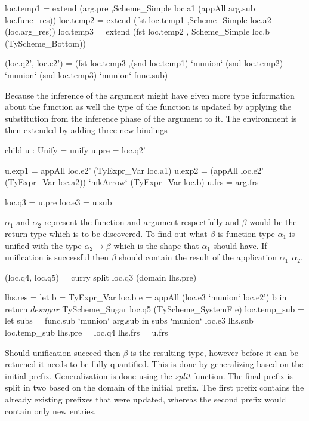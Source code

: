 \begin{code}
   loc.temp1 = extend (arg.pre
                      ,Scheme_Simple loc.a1 (appAll arg.sub loc.func_res))
   loc.temp2 = extend (fst loc.temp1
                      ,Scheme_Simple loc.a2 (loc.arg_res))
   loc.temp3 = extend (fst loc.temp2
                      , Scheme_Simple loc.b  (TyScheme_Bottom))
       
   (loc.q2', loc.e2') 
      = (fst loc.temp3
        ,(snd loc.temp1) `munion` (snd loc.temp2) `munion` (snd loc.temp3) `munion` func.sub)
\end{code}
Because the inference of the argument might have given more type information about the function as well the type of the function is updated by applying the substitution from the inference phase of the argument to it. The environment is then extended by adding three new bindings 

\begin{code}
   child u : Unify = unify
   u.pre  = loc.q2'
       
   u.exp1 = appAll loc.e2' (TyExpr_Var loc.a1)
   u.exp2 = (appAll loc.e2' (TyExpr_Var loc.a2)) `mkArrow` (TyExpr_Var loc.b)
   u.frs  = arg.frs
       
   loc.q3 = u.pre
   loc.e3 = u.sub
\end{code}
$\alpha_1$ and $\alpha_2$ represent the function and argument respectfully and $\beta$ would be the return type which is to be discovered. To find out what $\beta$ is function type $\alpha_1$ is unified with the type $\alpha_2 \rightarrow \beta$ which is the shape that $\alpha_1$ should have. If unification is successful then $\beta$ should contain the result of the application $\alpha_1 \hspace{5pt} \alpha_2$.


\begin{code}       
   (loc.q4, loc.q5) = curry split loc.q3 (domain lhs.pre)
    
   lhs.res = let b = TyExpr_Var loc.b
                 e = appAll (loc.e3 `munion` loc.e2') b
             in return $ desugar $ TyScheme_Sugar loc.q5 (TyScheme_SystemF e)
   loc.temp_sub = let subs = func.sub `munion` arg.sub 
                  in subs `munion` loc.e3
   lhs.sub = loc.temp_sub
   lhs.pre = loc.q4
   lhs.frs = u.frs
\end{code}
Should unification succeed then $\beta$ is the resulting type, however before it can be returned it needs to be fully quantified. This is done by generalizing based on the initial prefix. Generalization is done using the \emph{split} function. The final prefix is split in two based on the domain of the initial prefix. The first prefix contains the already existing prefixes that were updated, whereas the second prefix would contain only new entries.

